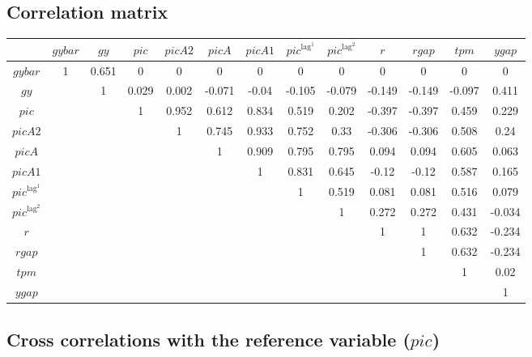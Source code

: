 \subsection{Correlation matrix}

\begin{tabular}{c|cccccccccccc|}
  & ${g\!y\!b\!a\!r}$ & ${g\!y}$ & ${p\!i\!c}$ & ${p\!i\!c\!A\!2}$ & ${p\!i\!c\!A}$ & ${p\!i\!c\!A\!1}$ & ${p\!i\!c}^{\mathrm{lag}^{\mathrm{1}}}$ & ${p\!i\!c}^{\mathrm{lag}^{\mathrm{2}}}$ & $r$ & ${r\!g\!a\!p}$ & ${t\!p\!m}$ & ${y\!g\!a\!p}$\\
\hline
${g\!y\!b\!a\!r}$ & 1 & 0.651 & 0 & 0 & 0 & 0 & 0 & 0 & 0 & 0 & 0 & 0 \\
${g\!y}$ &  & 1 & 0.029 & 0.002 & -0.071 & -0.04 & -0.105 & -0.079 & -0.149 & -0.149 & -0.097 & 0.411 \\
${p\!i\!c}$ &  &  & 1 & 0.952 & 0.612 & 0.834 & 0.519 & 0.202 & -0.397 & -0.397 & 0.459 & 0.229 \\
${p\!i\!c\!A\!2}$ &  &  &  & 1 & 0.745 & 0.933 & 0.752 & 0.33 & -0.306 & -0.306 & 0.508 & 0.24 \\
${p\!i\!c\!A}$ &  &  &  &  & 1 & 0.909 & 0.795 & 0.795 & 0.094 & 0.094 & 0.605 & 0.063 \\
${p\!i\!c\!A\!1}$ &  &  &  &  &  & 1 & 0.831 & 0.645 & -0.12 & -0.12 & 0.587 & 0.165 \\
${p\!i\!c}^{\mathrm{lag}^{\mathrm{1}}}$ &  &  &  &  &  &  & 1 & 0.519 & 0.081 & 0.081 & 0.516 & 0.079 \\
${p\!i\!c}^{\mathrm{lag}^{\mathrm{2}}}$ &  &  &  &  &  &  &  & 1 & 0.272 & 0.272 & 0.431 & -0.034 \\
$r$ &  &  &  &  &  &  &  &  & 1 & 1 & 0.632 & -0.234 \\
${r\!g\!a\!p}$ &  &  &  &  &  &  &  &  &  & 1 & 0.632 & -0.234 \\
${t\!p\!m}$ &  &  &  &  &  &  &  &  &  &  & 1 & 0.02 \\
${y\!g\!a\!p}$ &  &  &  &  &  &  &  &  &  &  &  & 1 \\
\hline
\end{tabular}


\subsection{Cross correlations with the reference variable (${p\!i\!c}$)}

